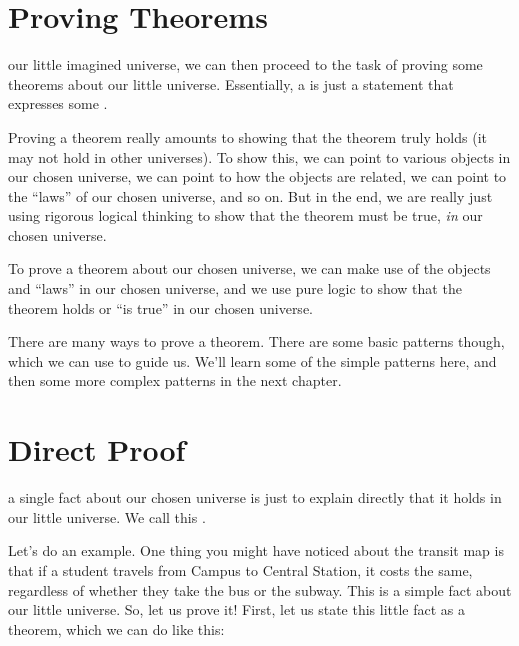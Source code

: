 \documentclass[../../../main.tex]{subfiles}
\begin{document}
\section{Proving Theorems}

 our little imagined universe, we can then proceed to the task of proving some theorems about our little universe. Essentially, a  is just a statement that expresses some . 

\begin{aside}
  \begin{remark}
    Proving a theorem really amounts to showing that the theorem truly holds  (it may not hold in other universes). To show this, we can point to various objects in our chosen universe, we can point to how the objects are related, we can point to the ``laws'' of our chosen universe, and so on. But in the end, we are really just using rigorous logical thinking to show that the theorem must be true, \emph{in} our chosen universe.
  \end{remark}
\end{aside}

To prove a theorem about our chosen universe, we can make use of the objects and ``laws'' in our chosen universe, and we use pure logic to show that the theorem holds or ``is true'' in our chosen universe.

There are many ways to prove a theorem. There are some basic patterns though, which we can use to guide us. We'll learn some of the simple patterns here, and then some more complex patterns in the next chapter.


\section{Direct Proof}

 a single fact about our chosen universe is just to explain directly that it holds in our little universe. We call this . 

Let's do an example. One thing you might have noticed about the transit map is that if a student travels from Campus to Central Station, it costs the same, regardless of whether they take the bus or the subway. This is a simple fact about our little universe. So, let us prove it! First, let us state this little fact as a theorem, which we can do like this:
\end{document}
